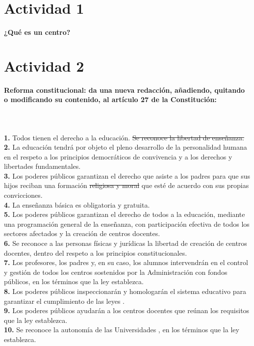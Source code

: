 
\section{Actividad 1}

\paragraph{¿Qué es un centro?}


\section{Actividad 2}


\paragraph{Reforma constitucional: da una nueva redacción, añadiendo, quitando o modificando su contenido, al artículo 27 de la Constitución:}

\textcolor{white}{a}\\\\
\textbf{1.} Todos tienen el derecho a la educación. \sout{Se reconoce la libertad de enseñanza.}\\
\textbf{2.} La educación tendrá por objeto el pleno desarrollo de la personalidad humana en el respeto a los principios democráticos de convivencia y a los derechos y libertades fundamentales. \\
\textbf{3.} Los poderes públicos garantizan el derecho que asiste a los padres para que sus hijos reciban una formación \sout{religiosa y moral} que esté de acuerdo con sus propias convicciones. \\
\textbf{4.} La enseñanza básica es obligatoria y gratuita.\\
\textbf{5.} Los poderes públicos garantizan el derecho de todos a la educación, mediante una programación general de la enseñanza, con participación efectiva de todos los sectores afectados y la creación de centros docentes. \\
\textbf{6.} Se reconoce a las personas físicas y jurídicas la libertad de creación de centros docentes, dentro del respeto a los principios constitucionales. \\
\textbf{7.} Los profesores, los padres y, en su caso, los alumnos intervendrán en el control y gestión de todos los centros sostenidos por la Administración con fondos públicos, en los términos que la ley establezca.\\
\textbf{8.} Los poderes públicos inspeccionarán y homologarán el sistema educativo para garantizar el cumplimiento de las leyes . \\
\textbf{9.} Los poderes públicos ayudarán a los centros docentes que reúnan los requisitos que la ley establezca.\\
\textbf{10.} Se reconoce la autonomía de las Universidades , en los términos que la ley establezca.\\


